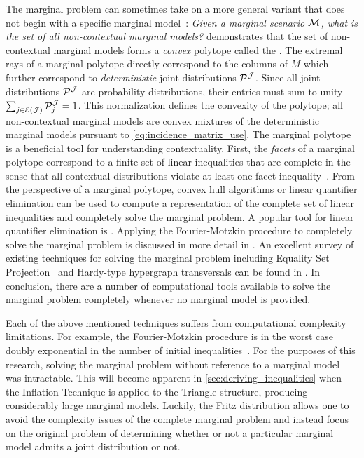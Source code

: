 \documentclass[aps, 10pt, english, twoside, pra, nofootinbib, tightenlines, longbibliography, superscriptaddress]{revtex4-1}
\begin{document}
    The marginal problem can sometimes take on a more general variant that does not begin with a specific marginal model~\cite{Abramsky_2012,Mansfield_2012,Fritz_2011}: \textit{Given a marginal scenario $\mathcal{M}$, what is the set of all non-contextual marginal models?} \citet{Pitowsky_1991} demonstrates that the set of non-contextual marginal models forms a \textit{convex} polytope called the . The extremal rays of a marginal polytope directly correspond to the columns of $M$ which further correspond to \textit{deterministic} joint distributions $\probvec^{\jointvar}$. Since all joint distributions $\probvec^{\jointvar}$ are probability distributions, their entries must sum to unity $\sum_{j \in \Events{\jointvar}} \probvec^{\jointvar}_j = 1$. This normalization defines the convexity of the polytope; all non-contextual marginal models are convex mixtures of the deterministic marginal models pursuant to \cref{eq:incidence_matrix_use}. The marginal polytope is a beneficial tool for understanding contextuality. First, the \textit{facets} of a marginal polytope correspond to a finite set of linear inequalities that are complete in the sense that all contextual distributions violate at least one facet inequality~\cite{Brunner_2013}. From the perspective of a marginal polytope, convex hull algorithms or linear quantifier elimination can be used to compute a representation of the complete set of linear inequalities and completely solve the marginal problem. A popular tool for linear quantifier elimination is  \cite{Dantzig_1973,Inflation,Abramsky_2012,jones_2004}. Applying the Fourier-Motzkin procedure to completely solve the marginal problem is discussed in more detail in \citet{Fritz_2011}. An excellent survey of existing techniques for solving the marginal problem including Equality Set Projection~\cite{jones_2004} and Hardy-type hypergraph transversals can be found in \citet{Inflation}. In conclusion, there are a number of computational tools available to solve the marginal problem completely whenever no marginal model is provided.

    Each of the above mentioned techniques suffers from computational complexity limitations. For example, the Fourier-Motzkin procedure is in the worst case doubly exponential in the number of initial inequalities~\cite{Dantzig_1973}. For the purposes of this research, solving the marginal problem without reference to a marginal model was intractable. This will become apparent in \cref{sec:deriving_inequalities} when the Inflation Technique is applied to the Triangle structure, producing considerably large marginal models. Luckily, the Fritz distribution allows one to avoid the complexity issues of the complete marginal problem and instead focus on the original problem of determining whether or not a particular marginal model admits a joint distribution or not.
\end{document}
